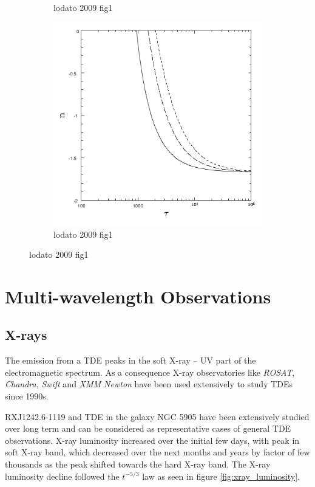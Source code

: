 \documentclass{tda}
\begin{document}
\begin{figure}
\begin{subfigure} {.33\linewidth}
		\caption{lodato 2009 fig1}
	\end{subfigure}
	\begin{subfigure} {.33\linewidth}
		\centering
		\includegraphics[width=\textwidth]{./images/lodato2009b.png}
		\caption{lodato 2009 fig1}
	\end{subfigure}
\end{figure}

\section{Multi-wavelength Observations}


\subsection{X-rays} \label{subsec:xrays}

The emission from a TDE peaks in the soft X-ray -- UV part of the electromagnetic spectrum. As a consequence X-ray observatories like \textit{ROSAT}, \textit{Chandra}, \textit{Swift} and \textit{XMM Newton} have been used extensively to study TDEs since 1990s.

RXJ1242.6-1119 and TDE in the galaxy NGC 5905 have been extensively studied over long term and can be considered as representative cases of general TDE observations. X-ray luminosity increased over the initial few days, with peak in soft X-ray band, which decreased over the next months and years by factor of few thousands as the peak shifted towards the hard X-ray band. The X-ray luminosity decline followed the \(t^{-5/3}\) law \cite{komossa_tidal_2015} as seen in figure \ref{fig:xray_luminosity}.
\end{document}
